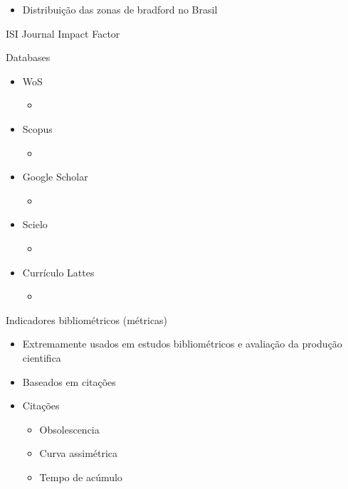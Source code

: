 \documentclass[bigger]{beamer}
\begin{document}
\begin{frame}[label={sec:orgb2fbc6d}]{\cite{mugnaini2019}}
\begin{itemize}
\item Distribuição das zonas de bradford no Brasil
\end{itemize}
\end{frame}

\begin{frame}[label={sec:orge61e507}]{ISI Journal Impact Factor}
\end{frame}



\begin{frame}[label={sec:org22fa978}]{Databases}
\begin{itemize}
\item \alert{WoS}
\begin{itemize}
\item 
\end{itemize}

\item \alert{Scopus}
\begin{itemize}
\item 
\end{itemize}

\item \alert{Google Scholar}
\begin{itemize}
\item 
\end{itemize}

\item \alert{Scielo}
\begin{itemize}
\item 
\end{itemize}

\item \alert{Currículo Lattes}
\begin{itemize}
\item 
\end{itemize}
\end{itemize}
\end{frame}


\begin{frame}[label={sec:orge0617f9}]{Indicadores bibliométricos (métricas)}
\begin{itemize}
\item Extremamente usados em estudos bibliométricos e avaliação da produção cientifica
\item Baseados em citações

\item Citações
\begin{itemize}
\item Obsolescencia
\item Curva assimétrica
\item Tempo de acúmulo
\end{itemize}
\end{itemize}
\end{frame}
\end{document}
